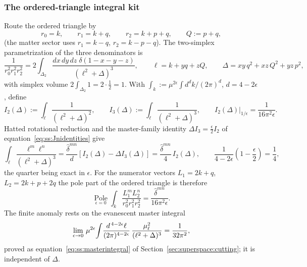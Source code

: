 \subsubsection*{The ordered-triangle integral kit}

Route the ordered triangle by
\begin{equation}\label{eq:ss:rules-routing}
r_{0}=k,\qquad r_{1}=k+q,\qquad r_{2}=k+p+q,\qquad Q:=p+q ,
\end{equation}
(the matter sector uses $r_{1}=k-q$, $r_{2}=k-p-q$). The two-simplex parametrization of the three denominators is
\begin{equation}\label{eq:ss:rules-simplex}
\frac{1}{r_{0}^{2}r_{1}^{2}r_{2}^{2}}
=2\int_{\Delta_{2}}\frac{dx\,dy\,dz\;\delta(1-x-y-z)}{(\ell^{2}+\Delta)^{3}},
\qquad
\ell=k+yq+zQ,
\qquad
\Delta=xy\,q^{2}+xz\,Q^{2}+yz\,p^{2} ,
\end{equation}
with simplex volume $2\int_{\Delta_{2}}1=2\cdot\tfrac12=1$. With $\int_{k}:=\mu^{2\epsilon}\int d^{d}k/(2\pi)^{d}$, $d=4-2\epsilon$, define
\begin{equation}\label{eq:ss:rules-I23}
I_{2}(\Delta):=\int_{\ell}\frac{1}{(\ell^{2}+\Delta)^{2}},
\qquad
I_{3}(\Delta):=\int_{\ell}\frac{1}{(\ell^{2}+\Delta)^{3}},
\qquad
I_{2}(\Delta)\Big|_{1/\epsilon}=\frac{1}{16\pi^{2}\epsilon} .
\end{equation}
Hatted rotational reduction and the master-family identity $\Delta I_{3}=\frac{\epsilon}{2}I_{2}$ of equation~\eqref{eq:ss:Jnidentities} give
\begin{equation}\label{eq:ss:rules-tensor}
\int_{\ell}\frac{\ell^{m}\ell^{n}}{(\ell^{2}+\Delta)^{3}}
=\frac{\widehat\delta^{mn}}{d}\left[I_{2}(\Delta)-\Delta I_{3}(\Delta)\right]
=\frac{\widehat\delta^{mn}}{4}\,I_{2}(\Delta),
\qquad
\frac{1}{4-2\epsilon}\left(1-\frac{\epsilon}{2}\right)=\frac14 ,
\end{equation}
the quarter being exact in $\epsilon$. For the numerator vectors $L_{1}=2k+q$, $L_{2}=2k+p+2q$ the pole part of the ordered triangle is therefore
\begin{equation}\label{eq:ss:rules-pole}
\operatorname*{Pole}_{\epsilon=0}
\int_{k}\frac{L_{1}^{m}L_{2}^{n}}{r_{0}^{2}r_{1}^{2}r_{2}^{2}}
=\frac{\widehat\delta^{mn}}{16\pi^{2}\epsilon} .
\end{equation}
The finite anomaly rests on the evanescent master integral
\begin{equation}\label{eq:ss:rules-master}
\lim_{\epsilon\to0}\,
\mu^{2\epsilon}\!\int\!\frac{d^{\,4-2\epsilon}\ell}{(2\pi)^{4-2\epsilon}}\,
\frac{\mu_\ell^{2}}{(\ell^{2}+\Delta)^{3}}
=\frac{1}{32\pi^{2}} ,
\end{equation}
proved as equation~\eqref{eq:ss:masterintegral} of Section~\ref{sec:superspace:cutting}; it is independent of $\Delta$.

